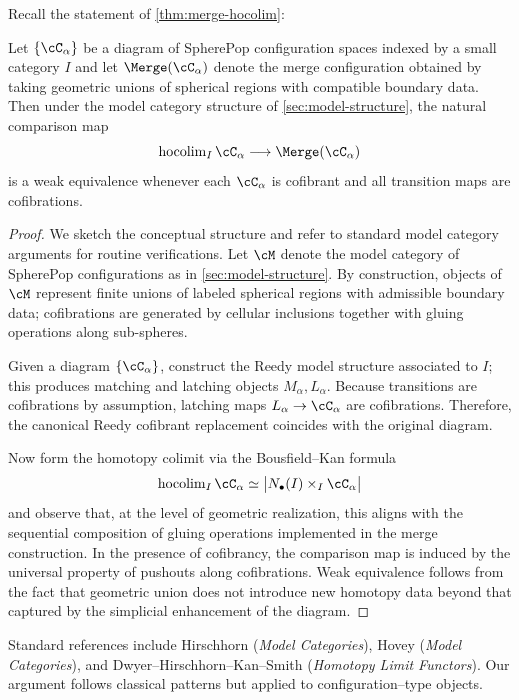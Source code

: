 Recall the statement of \cref{thm:merge-hocolim}:
\begin{theorem}
Let $\{\cC_\alpha\}$ be a diagram of SpherePop configuration spaces
indexed by a small category $I$ and let $\Merge(\cC_\alpha)$ denote the
merge configuration obtained by taking geometric unions of spherical
regions with compatible boundary data.  Then under the model category
structure of \cref{sec:model-structure}, the natural comparison map
\[
\hocolim_I \cC_\alpha \longrightarrow \Merge(\cC_\alpha)
\]
is a weak equivalence whenever each $\cC_\alpha$ is cofibrant and all
transition maps are cofibrations.
\end{theorem}

\begin{proof}
We sketch the conceptual structure and refer to standard model
category arguments for routine verifications.  Let $\cM$ denote the
model category of SpherePop configurations as in
\cref{sec:model-structure}.  By construction, objects of $\cM$
represent finite unions of labeled spherical regions with admissible
boundary data; cofibrations are generated by cellular inclusions
together with gluing operations along sub-spheres.

Given a diagram $\{\cC_\alpha\}$, construct the Reedy model structure
associated to $I$; this produces matching and latching objects
$M_\alpha,L_\alpha$.
Because transitions are cofibrations by assumption, latching maps
$L_\alpha \to \cC_\alpha$ are cofibrations.  Therefore, the canonical
Reedy cofibrant replacement coincides with the original diagram.

Now form the homotopy colimit via the Bousfield--Kan formula
\[
\hocolim_I \cC_\alpha \simeq
\bigl|N_\bullet(I)\times_I \cC_\alpha\bigr|
\]
and observe that, at the level of geometric realization, this aligns
with the sequential composition of gluing operations implemented in
the merge construction.  In the presence of cofibrancy, the
comparison map is induced by the universal property of pushouts
along cofibrations.  Weak equivalence follows from the fact that
geometric union does not introduce new homotopy data beyond that
captured by the simplicial enhancement of the diagram.
\end{proof}

\begin{remark}
Standard references include Hirschhorn (\emph{Model Categories}),
Hovey (\emph{Model Categories}), and Dwyer--Hirschhorn--Kan--Smith
(\emph{Homotopy Limit Functors}).  Our argument follows classical
patterns but applied to configuration--type objects.
\end{remark}

